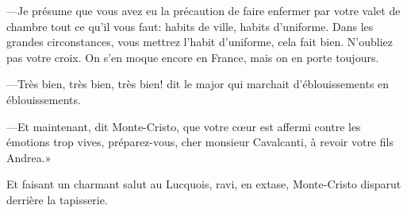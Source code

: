 —Je présume que vous avez eu la précaution de faire enfermer par votre valet de chambre tout ce qu'il vous faut: habits de ville, habits d'uniforme. Dans les grandes circonstances, vous mettrez l'habit d'uniforme, cela fait bien. N'oubliez pas votre croix. On s'en moque encore en France, mais on en porte toujours. 

—Très bien, très bien, très bien! dit le major qui marchait d'éblouissements en éblouissements. 

—Et maintenant, dit Monte-Cristo, que votre cœur est affermi contre les émotions trop vives, préparez-vous, cher monsieur Cavalcanti, à revoir votre fils Andrea.» 

Et faisant un charmant salut au Lucquois, ravi, en extase, Monte-Cristo disparut derrière la tapisserie. 